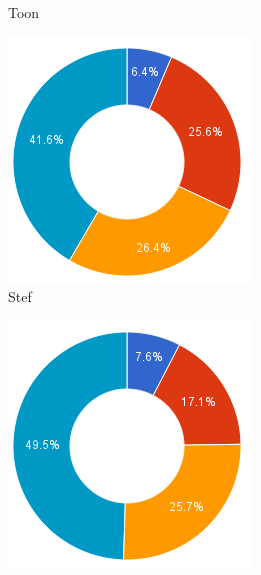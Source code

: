 \documentclass[i1]{oss}
\begin{document}
\begin{figure}[h!]
\begin{subfigure}[hb]{0.20\textwidth}
                \caption{Toon}
        \end{subfigure}%
        \begin{subfigure}[hb]{0.20\textwidth}
                \centering
                \includegraphics[width=\textwidth]{chart_4}
                \caption{Stef}
        \end{subfigure}%
        \begin{subfigure}[hb]{0.20\textwidth}
                \centering
                \includegraphics[width=\textwidth]{chart_5}

\end{subfigure}
\end{figure}
\end{document}
